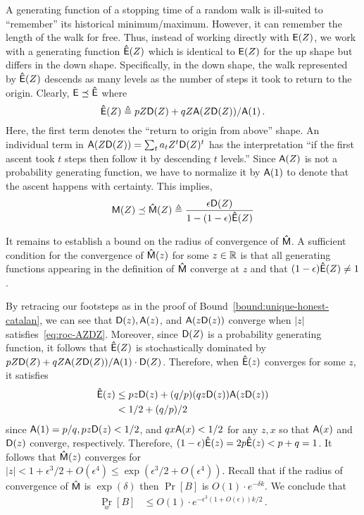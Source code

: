   A generating function of a stopping time of a random walk 
  is ill-suited to ``remember'' its historical minimum/maximum. 
  However, it can remember the length of the walk for free. 
  Thus, instead of working directly with $\mathsf{E}(Z)$, 
  we work with a generating function $\mathsf{\hat{E}}(Z)$ 
  which is identical to $\mathsf{E}(Z)$ for the up shape 
  but differs in the down shape. 
  Specifically, in the down shape, 
  the walk represented by $\mathsf{\hat{E}}(Z)$ descends as many levels 
  as the number of steps it took to return to the origin. 
  Clearly, $\mathsf{E} \preceq \mathsf{\hat{E}}$ where 
  \[
      \mathsf{\hat{E}}(Z) \triangleq p Z \mathsf{D}(Z) + q Z \mathsf{A}(Z \mathsf{D}(Z) )/\mathsf{A}(1)
      \,.
  \] 
  Here, the first term denotes the ``return to origin from above'' shape. 
  An individual term in $\mathsf{A}(Z \mathsf{D}(Z)) = \sum_t a_t Z^t \mathsf{D}(Z)^t$ 
  has the interpretation 
  ``if the first ascent took $t$ steps then follow it by descending $t$ levels.''
  Since $\mathsf{A}(Z)$ is not a probability generating function, 
  we have to normalize it by $\mathsf{A}(1)$ to denote that 
  the ascent happens with certainty. 
  This implies, 
  \[
      \mathsf{M}(Z) 
          \preceq \mathsf{\hat{M}}(Z) 
          \triangleq \frac{\epsilon \mathsf{D}(Z)}{1 - (1 - \epsilon) \mathsf{\hat{E}}(Z) }
  \]

  It remains to establish a bound on the radius of convergence of
  $\mathsf{\hat{M}}$. 
  A sufficient condition for the convergence of
  $\mathsf{\hat{M}}(z)$ for some $z \in \mathbb{R}$ is 
  that all generating functions appearing in the definition of
  $\mathsf{\hat{M}}$ converge at $z$ and 
  that $(1-\epsilon) \mathsf{\hat{E}}(Z) \neq 1$. 

  By retracing our footsteps as in the proof of Bound~\ref{bound:unique-honest-catalan}, 
  we can see that $\mathsf{D}(z), \mathsf{A}(z)$, and $\mathsf{A}(z \mathsf{D}(z))$ converge 
  when $|z|$ satisfies~\eqref{eq:roc-AZDZ}. 
  Moreover, since $\mathsf{D}(Z)$ is a probability generating function, 
  it follows that $\mathsf{\hat{E}}(Z)$ is stochastically dominated by 
  $p Z \mathsf{D}(Z) + q Z \mathsf{A}(Z \mathsf{D}(Z) )/\mathsf{A}(1) \cdot \mathsf{D}(Z)$.
  Therefore, when $\mathsf{\hat{E}}(z)$ converges for some $z$, it satisfies 
  \begin{align*}
      \mathsf{\hat{E}}(z)
      &\leq pz\mathsf{D}(z) + (q/p) (q z\mathsf{D}(z))\mathsf{A}(z\mathsf{D}(z)) \\
      &< 1/2 + (q/p)/2
  \end{align*}
  since $\mathsf{A}(1) = p/q, pz\mathsf{D}(z) < 1/2$, 
  and $qx\mathsf{A}(x) < 1/2$ for any $z, x$ so that $\mathsf{A}(x)$ and $\mathsf{D}(z)$ converge, respectively. 
  Therefore, $(1-\epsilon)\mathsf{\hat{E}}(z) = 2p \mathsf{\hat{E}}(z) < p + q = 1$. 
  It follows that 
  $\mathsf{\hat{M}}(z)$ converges for
  $|z| < 1 + \epsilon^3/2 + O(\epsilon^4) \leq \exp(\epsilon^3/2 + O(\epsilon^4))$. 
  Recall that if the radius of convergence of
  $\mathsf{\hat{M}}$ is $\exp(\delta)$ then 
  $\Pr[B]$ is 
  $O(1) \cdot e^{-\delta k}$. 
  We conclude that
  \begin{align}
    \Pr_w[B] 
      &\leq O(1) \cdot e^{-\epsilon^3(1 + O(\epsilon))k/2} \,.
  \label{eq:prob_two_catalan_gf}
  \end{align}


